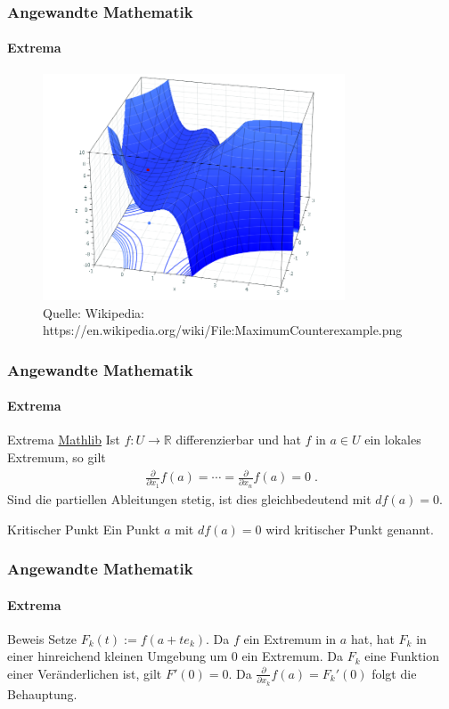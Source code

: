 \documentclass{beamer}
\begin{document}
\begin{frame}
    \frametitle{Angewandte Mathematik}
\framesubtitle{Extrema}

\begin{figure}[H]
      \centering
    \includegraphics[width=0.8\textwidth]{images/MaximumCounterexample}
      \caption{Quelle: Wikipedia: https://en.wikipedia.org/wiki/File:MaximumCounterexample.png}
\end{figure}
 \end{frame}



\begin{frame}
    \frametitle{Angewandte Mathematik}
\framesubtitle{Extrema}
    \begin{block}{Extrema \href{https://github.com/leanprover-community/mathlib4/blob/f4f0b47a2f859d27e965c812344deb1435fe8d48/Mathlib/Analysis/Calculus/LocalExtr/Basic.lean\#L184-L190}{Mathlib}}
 Ist $f: U  \to \mathbb{R}$ differenzierbar und hat  $f$ in $a \in U$ ein lokales Extremum, so gilt 
\begin{align*}
\frac{\partial}{\partial x_{1}} f(a) = \cdots  = \frac{\partial}{\partial x_{n}} f(a) = 0 \;.
\end{align*}
Sind die partiellen Ableitungen stetig, ist dies  gleichbedeutend mit $df(a) = 0$.
\end{block}
    \begin{block}{Kritischer Punkt}
 Ein Punkt $a$ mit $df(a) = 0$ wird kritischer Punkt genannt.
\end{block}

 \end{frame}

\begin{frame}
    \frametitle{Angewandte Mathematik}
\framesubtitle{Extrema}
    \begin{block}{Beweis}
Setze $F_k(t) := f(a + t e_k)$. Da $f$ ein Extremum in $a$ hat, hat $F_k$ in einer hinreichend kleinen Umgebung um $0$ ein Extremum. 
Da $F_k$ eine Funktion einer Veränderlichen ist, gilt $F'(0) = 0$. Da $\frac{\partial}{\partial x_k} f(a) = F_k'(0)$ folgt die Behauptung.
\end{block}
 \end{frame}
\end{document}
